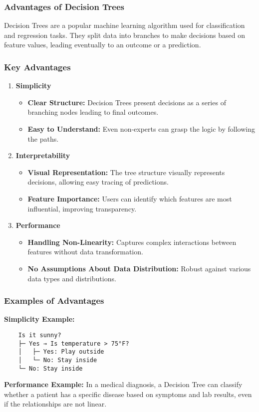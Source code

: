 \documentclass[aspectratio=169]{beamer}
\begin{document}
\begin{frame}[fragile]
    \frametitle{Advantages of Decision Trees}

    Decision Trees are a popular machine learning algorithm used for classification and regression tasks. They split data into branches to make decisions based on feature values, leading eventually to an outcome or a prediction.
\end{frame}

\begin{frame}[fragile]
    \frametitle{Key Advantages}

    \begin{enumerate}
        \item \textbf{Simplicity}
        \begin{itemize}
            \item \textbf{Clear Structure:} Decision Trees present decisions as a series of branching nodes leading to final outcomes.
            \item \textbf{Easy to Understand:} Even non-experts can grasp the logic by following the paths.
        \end{itemize}
        
        \item \textbf{Interpretability}
        \begin{itemize}
            \item \textbf{Visual Representation:} The tree structure visually represents decisions, allowing easy tracing of predictions.
            \item \textbf{Feature Importance:} Users can identify which features are most influential, improving transparency.
        \end{itemize}
        
        \item \textbf{Performance}
        \begin{itemize}
            \item \textbf{Handling Non-Linearity:} Captures complex interactions between features without data transformation.
            \item \textbf{No Assumptions About Data Distribution:} Robust against various data types and distributions.
        \end{itemize}
    \end{enumerate}
\end{frame}

\begin{frame}[fragile]
    \frametitle{Examples of Advantages}

    \textbf{Simplicity Example:}
    \begin{lstlisting}
    Is it sunny?
    ├─ Yes → Is temperature > 75°F?
    │   ├─ Yes: Play outside
    │   └─ No: Stay inside
    └─ No: Stay inside
    \end{lstlisting}

    \textbf{Performance Example:}
    In a medical diagnosis, a Decision Tree can classify whether a patient has a specific disease based on symptoms and lab results, even if the relationships are not linear.
\end{frame}
\end{document}
